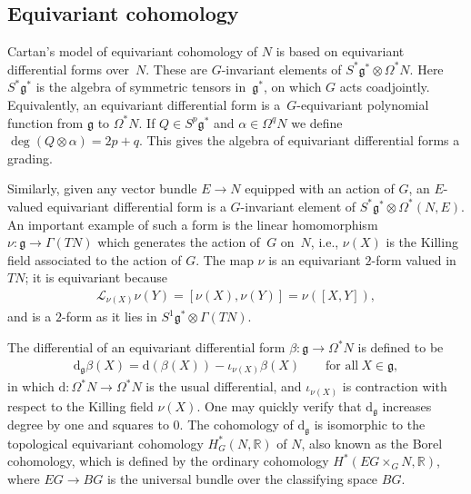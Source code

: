 \documentclass[pdftex]{sigma}
\newcommand{\LL}{{\mathcal{L}}}
\newcommand{\g}{{\mathfrak{g}}}
\newcommand{\R}{{\mathbb{R}}}
\newcommand{\1}{{\mathbb{1}}}
\def \d{\mathrm{d}}
\numberwithin{equation}{section}
\begin{document}
\subsection{Equivariant cohomology}
Cartan's model of equivariant cohomology of $N$ is based on {equivariant differential forms} over~$N$. These are $G$-invariant elements of $S^\ast \mathfrak{g}^\ast\otimes \Omega^\ast N$. Here $S^\ast\mathfrak{g}^\ast$ is the algebra of symmetric tensors in~$\mathfrak{g}^\ast$, on which $G$ acts coadjointly. Equivalently, an equivariant differential form is a~$G$-equi\-vari\-ant polynomial function from $\mathfrak{g}$ to $\Omega^\ast N$. If $Q\in S^p\g^\ast$ and $\alpha\in\Omega^qN$ we define $\deg(Q\otimes \alpha)=2p+q$. This gives the algebra of equivariant differential forms a grading.

Similarly, given any vector bundle $E\to N$ equipped with an action of $G$, an $E$-valued equivariant differential form is a $G$-invariant element of $S^\ast\g^\ast\otimes\Omega^\ast(N,E)$. An important example of such a form is the linear homomorphism $\nu\colon \g\to \Gamma(TN)$ which generates the action of~$G$ on~$N$, i.e., $\nu(X)$ is the Killing field associated to the action of $G$. The map $\nu$ is an equivariant $2$-form valued in $TN$; it is equivariant because
\begin{align*}
 \LL_{\nu(X)}\nu(Y)=[\nu(X),\nu(Y)]=\nu([X,Y]),
\end{align*}
and is a $2$-form as it lies in $S^1\g^\ast\otimes\Gamma(TN)$.

The differential of an equivariant differential form $\beta\colon \g\to\Omega^\ast N$ is defined to be
\begin{align}\label{equivariant-exterior-derivative}
\d_\g\beta(X) = \d(\beta(X))-\iota_{\nu(X)}\beta(X)\qquad\text{for all}\ X\in \g,
\end{align}
in which $\d\colon \Omega^\ast N\to\Omega^\ast N$ is the usual differential, and $\iota_{\nu(X)}$ is contraction with respect to the Killing field $\nu(X)$. One may quickly verify that $\d_\g$ increases degree by one and squares to 0. The cohomology of $\d_\g$ is isomorphic to the topological equivariant cohomology $H^\ast_G(N,\R)$ of $N$, also known as the Borel cohomology, which is defined by the ordinary cohomology $H^\ast(EG\times_GN,\R)$, where $EG\to BG$ is the universal bundle over the classifying space $BG$.
\end{document}
